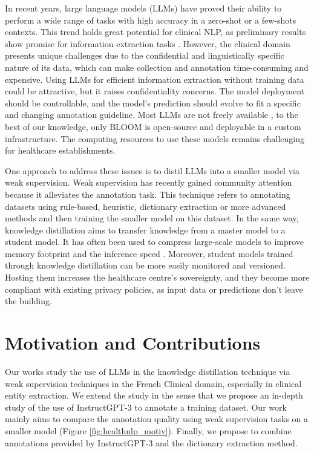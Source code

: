 In recent years, large language models (LLMs) have proved their ability to perform a wide range of tasks with high accuracy in a zero-shot or a few-shots contexts.
This trend holds great potential for clinical NLP, as preliminary results show promise for information extraction tasks \citep{Agrawal2022LargeExtractors}. 
However, the clinical domain presents unique challenges due to the confidential and linguistically specific nature of its data, which can make collection and annotation time-consuming and expensive.
Using LLMs for efficient information extraction without training data could be attractive, but it raises confidentiality concerns.
The model deployment should be controllable, and the model's prediction should evolve to fit a specific and changing annotation guideline.
Most LLMs are not freely available \citep{Scao2022BLOOM:Model,Ouyang2022TrainingFeedback,Thoppilan2022LaMDA:Applications}, to the best of our knowledge, only BLOOM is open-source and deployable in a custom infrastructure. The computing resources to use these models remains challenging for healthcare establishments.

One approach to address these issues is to distil LLMs into a smaller model via weak supervision. 
Weak supervision has recently gained community attention because it alleviates the annotation task. This technique refers to annotating datasets using rule-based, heuristic, dictionary extraction or more advanced methods and then training the smaller model on this dataset.
In the same way, knowledge distillation aims to transfer knowledge from a master model to a student model. It has often been used to compress large-scale models to improve memory footprint and the inference speed \citep{Li2021DynamicModels}. 
Moreover, student models trained through knowledge distillation can be more easily monitored and versioned. Hosting them increases the healthcare centre's sovereignty, and they become more compliant with existing privacy policies, as input data or predictions don't leave the building.

\section{Motivation and Contributions}
Our works study the use of LLMs in the knowledge distillation technique via weak supervision techniques in the French Clinical domain, especially in clinical entity extraction. We extend the \citet{Agrawal2022LargeExtractors} study in the sense that we propose an in-depth study of the use of InstructGPT-3 to annotate a training dataset. Our work mainly aims to compare the annotation quality using weak supervision tasks on a smaller model (Figure \ref{fig:healthnlp_motiv}). Finally, we propose to combine annotations provided by InstructGPT-3 and the dictionary extraction method.


